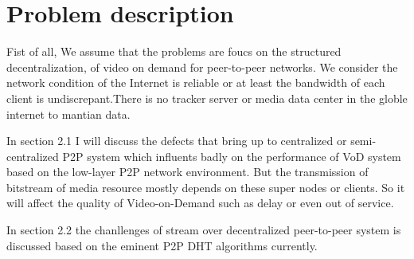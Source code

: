 \chapter{Problem description}
\label{chap1}
{
Fist of all, We assume that the problems are foucs on the structured decentralization, of video on demand for peer-to-peer networks. We consider the network condition of the Internet is reliable or at least the bandwidth of each client is undiscrepant.There is no tracker server or media data center in the globle internet to mantian data.

In section 2.1 I will discuss the defects that bring up to centralized or semi-centralized P2P system which influents badly on the performance of VoD system based on the low-layer P2P network environment. But the transmission of bitstream of media resource mostly depends on these super nodes or clients. So it will affect the quality of Video-on-Demand such as delay or even out of service.

In section 2.2 the chanllenges of stream over decentralized peer-to-peer system is discussed based on the eminent P2P DHT algorithms currently. 
}
